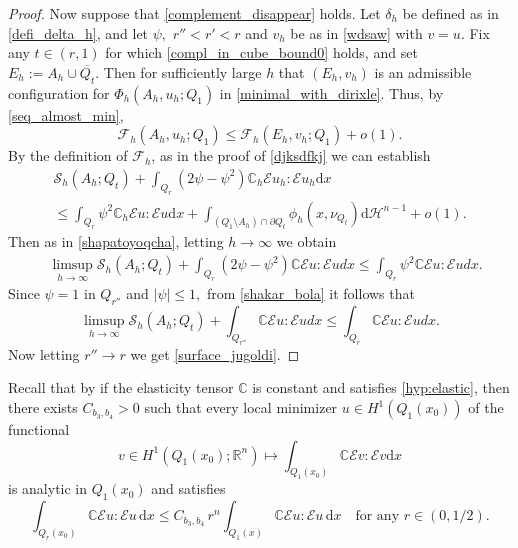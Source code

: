 \documentclass[reqno]{amsart}
\numberwithin{equation}{section}
\theoremstyle{plain}
\theoremstyle{definition}
\newcommand{\C}{\mathbb{C}}
\newcommand{\R}{\mathbb{R}}
\newcommand{\cH}{\mathcal{H}}
\newcommand{\cS}{\mathcal{S}}
\newcommand{\cF}{\mathcal{F}}
\newcommand{\p}{\partial}
\newcommand{\bound}{b}
\renewcommand{\d}{\mathrm{d}}
\newcommand{\str}[1]{\mathcal{E}#1}
\begin{document}
\begin{proof}
Now suppose that \eqref{complement_disappear} holds. Let $\delta_h$ be defined as in \eqref{defi_delta_h}, and let $\psi,$ $r''< r'<r$ and $v_h$ be as in \eqref{wdsaw} with $v=u$.
%
%
Fix any $t\in(r,1)$ for which \eqref{compl_in_cube_bound0} holds, and set $E_h:=A_h\cup \overline{Q_t}.$ Then for sufficiently large $h$ that $(E_h,v_h)$ is an admissible configuration for $\Phi_h(A_h,u_h;Q_1)$ in \eqref{minimal_with_dirixle}. Thus, by \eqref{seq_almost_min},
\begin{equation*} 
\cF_h(A_h,u_h;Q_1) \le \cF_h(E_h,v_h;Q_1) + o(1). 
\end{equation*}
By the definition of $\cF_h$, as in the proof of \eqref{djksdfkj} we can establish
\begin{multline*} 
\cS_h(A_h;Q_t) + \int_{Q_r}(2\psi -\psi^2)\C_h \str{u_h}  :\str{u_h}\d x \\
\le \int_{Q_r}\psi^2\C_h \str{u}:\str{u}\d x + \int_{(Q_1\setminus A_h) \cap \p Q_t} \phi_h(x,\nu_{Q_t})\d \cH^{n-1} + o(1).  
\end{multline*}
Then as in \eqref{shapatoyoqcha}, letting $h\to\infty$  we obtain
\begin{align}\label{shakar_bola}
& \limsup\limits_{h\to\infty} \cS_h(A_h;Q_t) +  \int_{Q_r}(2\psi -\psi^2)\C \str{u}:\str{u}dx
\le 
\int_{Q_r}\psi^2\C \str{u}:\str{u}dx. 
\end{align}
Since $\psi=1$ in $Q_{r''}$ and $|\psi|\le1,$   from \eqref{shakar_bola} it follows that 
\begin{equation*} 
\limsup\limits_{h\to\infty} \cS_h(A_h;Q_t) +    \int_{Q_{r''}} \C \str{u}:\str{u}dx \le \int_{Q_r} \C \str{u}:\str{u}dx. 
\end{equation*}
Now letting $r''\to r$ we get \eqref{surface_jugoldi}.
%
\end{proof}


Recall that by \cite[Theorem 6.2.1]{Morrey:2008} 
if the elasticity tensor $\C$ is constant and satisfies \eqref{hyp:elastic}, then there exists $C_{\bound_3,\bound_4}>0$ such that every  local minimizer $u\in H^1(Q_1(x_0) )$ of the functional 
\begin{equation}\label{almost_laplacian}
%
v\in H^1(Q_1(x_0);\R^n)\mapsto \int_{Q_1(x_0)} \C\str{v}:\str{v}\d x 
\end{equation}
%
is analytic in $Q_1(x_0)$ and satisfies 
%
\begin{equation}\label{c_gamma}
\int_{Q_r(x_0)}\C\str{u}:\str{u}\,\d x \le 
C_{\bound_3,\bound_4}\, r^n \int_{Q_1(x)} \C\str{u}:\str{u}\,\d x \quad\text{for any $r\in(0,1/2).$}
\end{equation}
%
\end{document}
